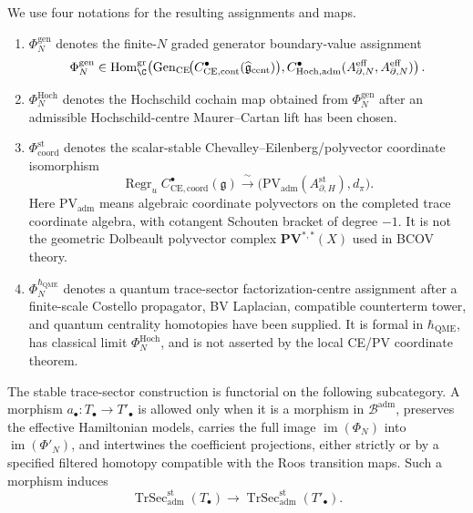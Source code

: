 \begin{defn}
  We use four notations for the resulting assignments and maps.
  \begin{enumerate}[label=\textup{(\roman*)}]
    \item \(\Phi_N^{\mathrm{gen}}\) denotes the finite-\(N\) graded
      generator boundary-value assignment
      \[
        \Phi_N^{\mathrm{gen}}
        \in
        \operatorname{Hom}^{\mathrm{gr}}_\C\!\left(
          \operatorname{Gen}_{\mathrm{CE}}\!
          \bigl(C^\bullet_{\mathrm{CE},\mathrm{cont}}
            (\widehat{\mathfrak g}_{\mathrm{cent}})\bigr),
          C^\bullet_{\mathrm{Hoch},\mathrm{adm}}
            (A^{\mathrm{eff}}_{\partial,N},
             A^{\mathrm{eff}}_{\partial,N})\right).
      \]
    \item \(\Phi_N^{\mathrm{Hoch}}\) denotes the Hochschild cochain map
      obtained from \(\Phi_N^{\mathrm{gen}}\) after an admissible
      Hochschild-centre Maurer--Cartan lift has been chosen.
    \item \(\Phi_{\mathrm{coord}}^{\mathrm{st}}\) denotes the
      scalar-stable Chevalley--Eilenberg/polyvector coordinate
      isomorphism
      \[
        \operatorname{Regr}_u
        C^\bullet_{\mathrm{CE},\mathrm{coord}}(\mathfrak g)
        \xrightarrow{\ \sim\ }
        \bigl(\mathrm{PV}_{\mathrm{adm}}
          (A_{\partial,H}^{\mathrm{st}}),d_\pi\bigr).
      \]
      Here \(\mathrm{PV}_{\mathrm{adm}}\) means algebraic coordinate
      polyvectors on the completed trace coordinate algebra, with
      cotangent Schouten bracket of degree \(-1\).  It is not the
      geometric Dolbeault polyvector complex
      \(\mathbf{PV}^{*,*}(X)\) used in BCOV theory.
    \item \(\Phi_N^{\hbar_{\mathrm{QME}}}\) denotes a quantum
      trace-sector factorization-centre assignment after a finite-scale
      Costello propagator, BV Laplacian, compatible counterterm tower,
      and quantum centrality homotopies have been supplied.  It is
      formal in \(\hbar_{\mathrm{QME}}\), has classical limit
      \(\Phi_N^{\mathrm{Hoch}}\), and is not asserted by the local
      CE/PV coordinate theorem.
  \end{enumerate}

  The stable trace-sector construction is functorial on the following
  subcategory.  A morphism \(a_\bullet\colon T_\bullet\to T'_\bullet\)
  is allowed only when it is a morphism in \(\mathcal B^{\mathrm{adm}}\),
  preserves the effective Hamiltonian models, carries the full image
  \(\operatorname{im}(\Phi_N)\) into
  \(\operatorname{im}(\Phi'_N)\), and intertwines the coefficient
  projections, either strictly or by a specified filtered homotopy
  compatible with the Roos transition maps.  Such a morphism induces
  \[
    \operatorname{TrSec}^{\mathrm{st}}_{\mathrm{adm}}(T_\bullet)
    \longrightarrow
    \operatorname{TrSec}^{\mathrm{st}}_{\mathrm{adm}}(T'_\bullet).
  \]


\end{defn}
